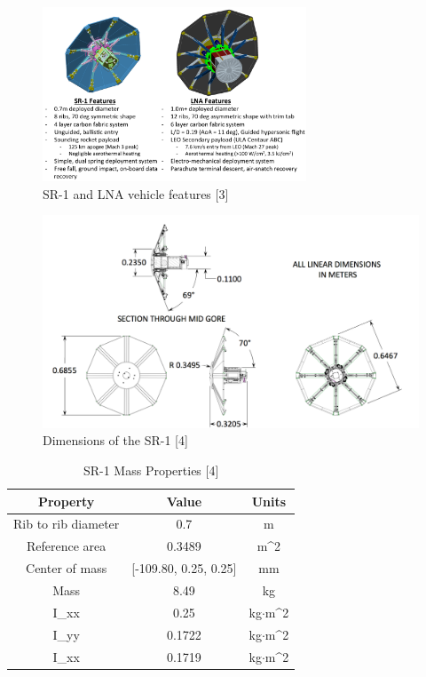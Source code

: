 \documentclass[12pt]{article}
\numberwithin{equation}{section}
\numberwithin{figure}{section}
\numberwithin{table}{section}
\begin{document}
\begin{figure}[h]
  \centering
  \includegraphics[width=0.7\textwidth]{SR-1 LNA Specs LNA Vehicle Concept.png}
  \caption{SR-1 and LNA vehicle features [3]}
  \label{fig:SR1_LNA}
\end{figure}

\begin{figure}[h]
  \centering
  \includegraphics[width=1\textwidth]{Figures/SR-1 Dimensions Subsonic Dynamic Testing.png}
  \caption{Dimensions of the SR-1 [4]}
  \label{fig:SR1_Dims}
\end{figure}

\begin{table}
\begin{center}
\caption{SR-1 Mass Properties [4]}
\begin{tabular}{|c|c|c|}
\hline
\textbf{Property} & \textbf{Value} & \textbf{Units} \\
\hline
Rib to rib diameter & 0.7 & m\\
\hline
Reference area & 0.3489 & m^2\\
\hline
Center of mass & [-109.80, 0.25, 0.25] & mm\\
\hline
Mass & 8.49 & kg\\
\hline
I_{xx} & 0.25 & kg$\cdot$m^2\\
\hline
I_{yy} & 0.1722 & kg$\cdot$m^2\\
\hline
I_{xx} & 0.1719 & kg$\cdot$m^2\\
\hline
\end{tabular}
\end{center}
\end{table}
\end{document}
